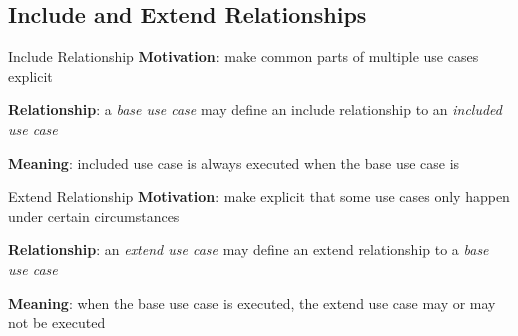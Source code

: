 \subsection{Include and Extend Relationships}
\begin{frame}[label=includeandextendslide]{\insertsubsection}
	\begin{fancycolumns}[animation=none]
		\begin{definition}{Include Relationship}
			\textbf{Motivation}: make common parts of multiple use cases explicit%
			
			\textbf{Relationship}: a \emph{base use case} may define an include relationship to an \emph{included use case}%
			
			\textbf{Meaning}: included use case is always executed when the base use case is
		\end{definition}
		\begin{definition}{Extend Relationship}
			\textbf{Motivation}: make explicit that some use cases only happen under certain circumstances%
			
			\textbf{Relationship}: an \emph{extend use case} may define an extend relationship to a \emph{base use case}%
			
			\textbf{Meaning}: when the base use case is executed, the extend use case may or may not be executed
		\end{definition}
		\nextcolumn
	\end{fancycolumns}
\end{frame}




